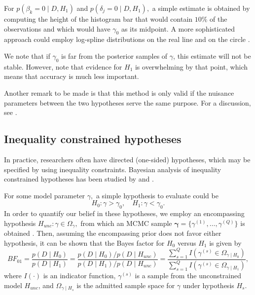 \documentclass[11pt,a4paper]{article}\usepackage[]{graphicx}\usepackage[]{color}
\newcommand{\bgam}{\boldsymbol{\gamma}}
\begin{document}
For \( p(\beta_k = 0 \mid D, H_1) \) and \( p(\delta_j = 0 \mid D, H_1),\) a simple estimate is obtained by computing the height of the histogram bar that would contain \( 10 \% \) of the observations and which would have \( \gamma_0 \) as its midpoint. A more sophisticated approach could employ log-spline distributions on the real line \citep{stone1997polynomial} and on the circle \citep{ferreira2008directional}.

We note that if \( \gamma_0 \) is far from the posterior samples of \( \gamma \), this estimate will not be stable. However, \citet{wagenmakers2010sdd} note that evidence for \( H_1 \) is overwhelming by that point, which means that accuracy is much less important.

Another remark to be made is that this method is only valid if the nuisance parameters between the two hypotheses serve the same purpose. For a discussion, see \citet{consonni2008compatibility}.


\subsection{Inequality constrained hypotheses} \label{ineqhyptests}

In practice, researchers often have directed (one-sided) hypotheses, which may be specified by using inequality constraints. Bayesian analysis of inequality constrained hypotheses has been studied by \citet{klugkist2005inequality} and \citet{wetzels2010encompassing}.

For some model parameter \( \gamma,\) a simple hypothesis to evaluate could be \[ H_0 : \gamma > \gamma_0 , \quad H_1 : \gamma < \gamma_0.\]
In order to quantify our belief in these hypotheses, we employ an encompassing hypothesis \( H_{unc} : \gamma \in \Omega_\gamma,\) from which an MCMC sample \( \bgam = \{ \gamma^{(1)}, \dots, \gamma^{(Q)} \} \) is obtained  \citep{klugkist2005inequality}. Then, assuming the encompassing prior does not favor either hypothesis, it can be shown that the Bayes factor for \( H_0 \) versus \( H_1 \) is given by
\begin{equation}
BF_{01} =
\frac{p(D \mid H_0)}{p(D \mid H_1)} =
\frac{p(D \mid H_0) / p(D \mid H_{unc})}{p(D \mid H_1) / p(D \mid H_{unc})} =
\frac{\sum_{s=1}^Q I\left(\gamma^{(s)} \in \Omega_{\gamma \mid H_0} \right)}{\sum_{s=1}^Q I\left(\gamma^{(s)} \in \Omega_{\gamma \mid H_1} \right)},
\end{equation}
where \( I(\cdot) \) is an indicator function, \( \gamma^{(s)} \) is a sample from the unconstrained model \( H_{unc} \), and \( \Omega_{\gamma \mid H_s} \) is the admitted sample space for \( \gamma \) under hypothesis \( H_s \).
\end{document}
